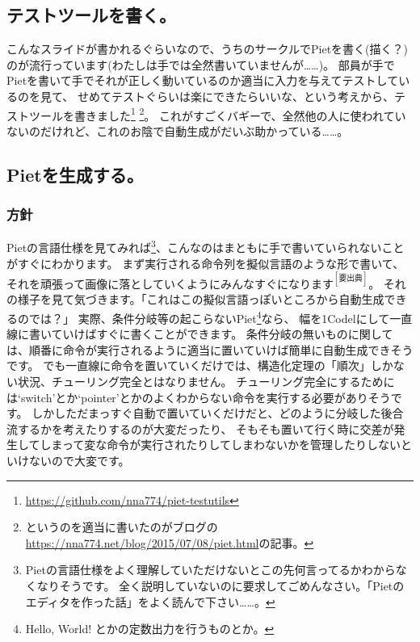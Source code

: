 \documentclass[twocolumn,8pt,b5paper]{extarticle}
\begin{document}
\subsection{テストツールを書く。}
こんなスライドが書かれるぐらいなので、うちのサークルでPietを書く(描く？)のが流行っています(わたしは手では全然書いていませんが……)。
部員が手でPietを書いて手でそれが正しく動いているのか適当に入力を与えてテストしているのを見て、
せめてテストぐらいは楽にできたらいいな、という考えから、テストツールを書きました\footnote{\url{https://github.com/nna774/piet-testutils}}
\footnote{というのを適当に書いたのがブログの\url{https://nna774.net/blog/2015/07/08/piet.html}の記事。}。
これがすごくバギーで、全然他の人に使われていないのだけれど、これのお陰で自動生成がだいぶ助かっている……。

\subsection{Pietを生成する。}
\subsubsection{方針}
Pietの言語仕様を見てみれば\footnote{Pietの言語仕様をよく理解していただけないとこの先何言ってるかわからなくなりそうです。
全く説明していないのに要求してごめんなさい。「Pietのエディタを作った話」をよく読んで下さい……。}、こんなのはまともに手で書いていられないことがすぐにわかります。
まず実行される命令列を擬似言語のような形で書いて、それを頑張って画像に落としていくようにみんなすぐになります$^{[要出典]}$。
それの様子を見て気づきます。「これはこの擬似言語っぽいところから自動生成できるのでは？」
実際、条件分岐等の起こらないPiet\footnote{Hello, World! とかの定数出力を行うものとか。}なら、
幅を1Codelにして一直線に書いていけばすぐに書くことができます。
条件分岐の無いものに関しては、順番に命令が実行されるように適当に置いていけば簡単に自動生成できそうです。
でも一直線に命令を置いていくだけでは、構造化定理の「順次」しかない状況、チューリング完全とはなりません。
チューリング完全にするためには`switch'とか`pointer'とかのよくわからない命令を実行する必要がありそうです。
しかしただまっすぐ自動で置いていくだけだと、どのように分岐した後合流するかを考えたりするのが大変だったり、
そもそも置いて行く時に交差が発生してしまって変な命令が実行されたりしてしまわないかを管理したりしないといけないので大変です。
\end{document}
